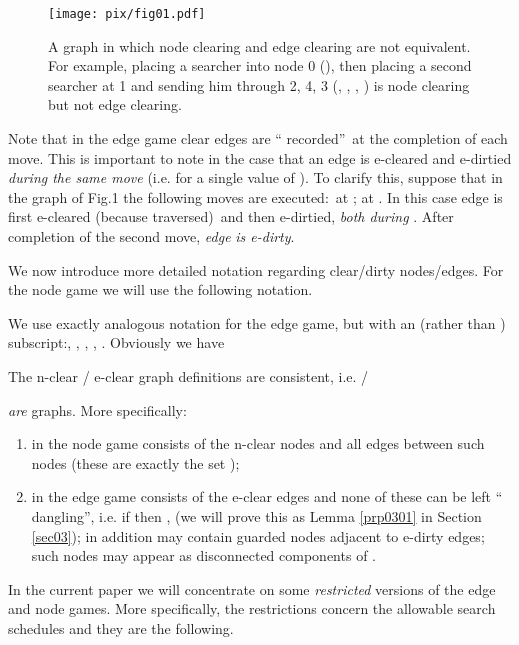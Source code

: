 \documentclass[11pt]{article}\usepackage{amsmath}
\begin{document}
\begin{figure}[h]
\centering
\texttt{[image: pix/fig01.pdf]}\caption{A graph in which node
clearing and edge clearing are not equivalent. For example, placing a searcher
into node 0 (), then placing a second searcher at 1 and sending
him through 2, 4, 3 (, , ,
) is node clearing but not edge clearing.}\label{fig:graph1}\end{figure}

\begin{remark}
\label{prp0202}Note that in the edge game clear edges are \textquotedblleft
recorded\textquotedblright\ at the completion of each move. This is important
to note in the case that an edge is e-cleared and e-dirtied \emph{during the
same move }(i.e. for a single value of ). To clarify this, suppose that in
the graph of Fig.1 the following moves are executed:\  at
;  at . In this case edge  is
first e-cleared (because traversed)\ and then e-dirtied, \emph{both during
}. After completion of the second move, \emph{edge } \emph{is e-dirty}.
\end{remark}

We now introduce more detailed notation regarding clear/dirty nodes/edges. For
the node game we will use the following notation.


We use exactly analogous notation for the edge game, but with an  (rather
than ) subscript:, , , ,
. Obviously we have



\begin{remark}
\label{prp0203}The n-clear / e-clear graph definitions are consistent, i.e.
 /

\emph{are} graphs. More specifically: \ 
\end{remark}

\begin{enumerate}
\item in the node game  consists of the
n-clear nodes and all edges between such nodes (these are exactly the set
);

\item in the edge game  consists of the
e-clear edges and none of these can be left \textquotedblleft
dangling\textquotedblright, i.e. if  then
, (we will prove this as Lemma
\ref{prp0301} in Section \ref{sec03}); in addition  may contain guarded nodes adjacent to e-dirty edges; such nodes may appear
as disconnected components of .
\end{enumerate}

In the current paper we will concentrate on some \emph{restricted} versions of
the edge and node games. More specifically, the restrictions concern the
allowable search schedules and they are the following.
\end{document}
